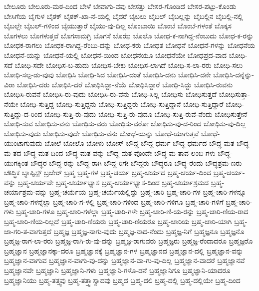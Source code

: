 ಬೇಲೂರು
ಬೇಲೂರು-ಮಠ-ದಿಂದ
ಬೇಳೆ
ಬೇವಾಗು-ವವು
ಬೇಸತ್ತು
ಬೇಸರ-ಗೊಂಡಿದೆ
ಬೇಸರ-ಪಟ್ಟು-ಕೊಂಡು
ಬೇಸಿಗೆಯ
ಬೈಗುಳ
ಬೈಠಕ್
ಬೈಠಕ್‌-ಖಾ-ನೆ-ಯಲ್ಲಿ
ಬೈದರೆ
ಬೈಬಲು
ಬೈಬಲ್
ಬೈಬಲ್ಲನ್ನು
ಬೈಬಲ್ಲಿನ
ಬೈಬಲ್ಲಿ-ನಲ್ಲಿ
ಬೈಬಲ್ಲೇ
ಬೈಬಲ್‌-ಗಳಿಂದ
ಬೈಯುತ್ತಾರೆ
ಬೈಯು-ವು-ದಿಲ್ಲ
ಬೊಂಬಾಯಿ
ಬೊಂಬೆ
ಬೊಂಬೆ-ಗಳಂತೆ
ಬೊಕ್ಕಸ
ಬೊಗಳಲು
ಬೊಗಳುತ್ತವೆ
ಬೊಗಸಾಮಗ್ರಿ
ಬೊಗಸೆ
ಬೊಝೆ
ಬೊಲೊ
ಬೋಧ-ಕ-ನಾಗಿದ್ದ-ನೆಂಬುದು
ಬೋಧ-ಕ-ರನ್ನು
ಬೋಧಕ-ರಾಗಲು
ಬೋಧಕ-ರಾಗಿದ್ದ-ರೆಂಬು-ದನ್ನು
ಬೋಧ-ಕರು
ಬೋಧತ
ಬೋಧನೆ
ಬೋಧನೆ-ಗಳನ್ನು
ಬೋಧನೆಯ
ಬೋಧನೆ-ಯನ್ನು
ಬೋಧನೆ-ಯಲ್ಲಿ
ಬೋಧನೆ-ಯಿಂದ
ಬೋಧನೆಯೂ
ಬೋಧನೆಯೇ
ಬೋಧಪ್ರದ-ವಾದ
ಬೋಧಿ-ಸದೆ
ಬೋಧಿ-ಸದೇ
ಬೋಧಿಸ-ಬ-ಹುದು
ಬೋಧಿಸ-ಬೇಕು
ಬೋಧಿಸ-ಲಾಗಿದೆ
ಬೋಧಿ-ಸ-ಲಾ-ರರು
ಬೋಧಿ-ಸಲು
ಬೋಧಿ-ಸಲ್ಪ-ಡು-ವುವು
ಬೋಧಿಸಿ
ಬೋಧಿ-ಸಿದ
ಬೋಧಿಸಿ-ದಂತೆ
ಬೋಧಿಸಿ-ದನು
ಬೋಧಿಸಿ-ದನೇ
ಬೋಧಿಸಿ-ದನ್ನೆನ್ನು-ವಿರಾ
ಬೋಧಿಸಿ-ದರು
ಬೋಧಿಸಿ-ದರೆ
ಬೋಧಿಸಿದ್ದಾ-ನೆಯೆ
ಬೋಧಿಸಿದ್ದಾರೆ
ಬೋಧಿ-ಸಿದ್ದು
ಬೋಧಿಸಿ-ರುವನು
ಬೋಧಿಸಿ-ರುವನೆ
ಬೋಧಿಸಿ-ರು-ವುದು
ಬೋಧಿಸಿ-ರು-ವೆನು
ಬೋಧಿ-ಸಿಲ್ಲ
ಬೋಧಿಸು
ಬೋಧಿಸುತ್ತದೆ
ಬೋಧಿಸುತ್ತಾ-ನೆಯೇ
ಬೋಧಿ-ಸುತ್ತಿದ್ದ
ಬೋಧಿ-ಸುತ್ತಿದ್ದನು
ಬೋಧಿ-ಸುತ್ತಿದ್ದರು
ಬೋಧಿ-ಸುತ್ತಿದ್ದಾನೆ
ಬೋಧಿ-ಸುತ್ತಿದ್ದಾರೆ
ಬೋಧಿ-ಸುತ್ತಿದ್ದು-ದ-ರಿಂದ
ಬೋಧಿ-ಸುತ್ತಿ-ರು-ವುದು
ಬೋಧಿ-ಸುತ್ತಿ-ರು-ವುದೂ
ಬೋಧಿ-ಸುತ್ತಿ-ರುವೆ-ನೆಂದು
ಬೋಧಿಸುತ್ತೇನೆ
ಬೋಧಿ-ಸುವ
ಬೋಧಿಸು-ವನು
ಬೋಧಿಸು-ವರು
ಬೋಧಿಸು-ವರೋ
ಬೋಧಿಸು-ವು-ದ-ರಿಂದ
ಬೋಧಿಸು-ವು-ದಿಲ್ಲ
ಬೋಧಿಸು-ವುದು
ಬೋಧಿಸು-ವುದೇ
ಬೋಧಿಸು-ವೆನು
ಬೋಧೆ-ಯನ್ನು
ಬೋಧೆ-ಯಾಗುತ್ತವೆ
ಬೋಧೆ-ಯುಂಟಾಗುವುದು
ಬೋಲೆ
ಬೋಲೊ
ಬೋಳು
ಬೋಸ್
ಬೌದ್ಧ
ಬೌದ್ಧ-ಧರ್ಮ
ಬೌದ್ಧ-ಧರ್ಮದ
ಬೌದ್ಧ-ಮತ
ಬೌದ್ಧ-ಮ-ತದ
ಬೌದ್ಧ-ಮತ-ದಿಂದ
ಬೌದ್ಧ-ಮತ-ವನ್ನು
ಬೌದ್ಧ-ಮತ-ವೊಂದೇ
ಬೌದ್ಧ-ಮ-ತಾವ-ಲಂಬಿ-ಗಳು
ಬೌದ್ಧ-ಯುಗಕ್ಕಿಂತ
ಬೌದ್ಧರ
ಬೌದ್ಧ-ರನ್ನು
ಬೌದ್ಧ-ರಾಗಿ
ಬೌದ್ಧ-ರಿಗೇ
ಬೌದ್ಧರು
ಬೌದ್ಧರೂ
ಬೌದ್ಧ-ರೆಂದು
ಬೌದ್ಧಶ್ರಮ-ಣರು
ಬೌದ್ಧಿಕ
ಬ್ಯಾಪ್ಟಿಸ್ಟ್
ಬ್ರಜೇರ್‌
ಬ್ರಹ್ಮ
ಬ್ರಹ್ಮ-ಗಳ
ಬ್ರಹ್ಮ-ಚರ್ಯ
ಬ್ರಹ್ಮ-ಚರ್ಯದ
ಬ್ರಹ್ಮ-ಚರ್ಯ-ದಿಂದ
ಬ್ರಹ್ಮ-ಚರ್ಯ-ವನ್ನು
ಬ್ರಹ್ಮ-ಚರ್ಯವೇ
ಬ್ರಹ್ಮ-ಚರ್ಯಾಭ್ಯಾಸ
ಬ್ರಹ್ಮ-ಚರ್ಯಾಭ್ಯಾಸ-ದಿಂದ
ಬ್ರಹ್ಮ-ಚರ್ಯಾಶ್ರಮದ
ಬ್ರಹ್ಮ-ಚರ್ಯಾಶ್ರಮ-ವನ್ನು
ಬ್ರಹ್ಮ-ಚರ್ಯೆಯ
ಬ್ರಹ್ಮ-ಚರ್ಯೆಯಲ್ಲಿದ್ದು
ಬ್ರಹ್ಮ-ಚಾರಿ
ಬ್ರಹ್ಮ-ಚಾರಿ-ಗಳ
ಬ್ರಹ್ಮ-ಚಾರಿ-ಗಳನ್ನೂ
ಬ್ರಹ್ಮ-ಚಾರಿ-ಗಳನ್ನೆಲ್ಲಾ
ಬ್ರಹ್ಮ-ಚಾರಿ-ಗ-ಳಲ್ಲಿ
ಬ್ರಹ್ಮ-ಚಾರಿ-ಗಳಿಂದ
ಬ್ರಹ್ಮ-ಚಾರಿ-ಗಳಿಗೂ
ಬ್ರಹ್ಮ-ಚಾರಿ-ಗಳಿಗೆ
ಬ್ರಹ್ಮ-ಚಾರಿ-ಗಳು
ಬ್ರಹ್ಮ-ಚಾರಿ-ಗಳೂ
ಬ್ರಹ್ಮ-ಚಾರಿ-ಗಳೆಲ್ಲಾ
ಬ್ರಹ್ಮ-ಚಾರಿ-ಗಳೇ
ಬ್ರಹ್ಮ-ಚಾರಿ-ಣಿ-ಯ-ರನ್ನು
ಬ್ರಹ್ಮ-ಚಾರಿ-ಣಿಯ-ರಾದ
ಬ್ರಹ್ಮ-ಚಾರಿ-ಣಿಯ-ರಿಲ್ಲದೆ
ಬ್ರಹ್ಮ-ಚಾರಿ-ಣಿಯರು
ಬ್ರಹ್ಮ-ಚಾರಿ-ಣಿಯರೂ
ಬ್ರಹ್ಮ-ಚಾರಿಯ
ಬ್ರಹ್ಮ-ಚಾರಿ-ಯಾಗಿ
ಬ್ರಹ್ಮ-ಜಾ-ಗರಿ-ತ-ವಾಗುತ್ತದೆ
ಬ್ರಹ್ಮಜ್ಞ
ಬ್ರಹ್ಮಜ್ಞ-ನಾಗು-ವುದು
ಬ್ರಹ್ಮಜ್ಞ-ನಾದ-ನೆಂದು
ಬ್ರಹ್ಮಜ್ಞ-ನಿಗೆ
ಬ್ರಹ್ಮಜ್ಞನೂ
ಬ್ರಹ್ಮಜ್ಞನೊ
ಬ್ರಹ್ಮಜ್ಞ-ರಾಗ-ಲಾ-ರರು
ಬ್ರಹ್ಮಜ್ಞ-ರಾಗಿ-ರು-ವು-ದನ್ನು
ಬ್ರಹ್ಮಜ್ಞ-ರಾಗುವರು
ಬ್ರಹ್ಮಜ್ಞರು
ಬ್ರಹ್ಮಜ್ಞ-ರೆಂದಾದರೂ
ಬ್ರಹ್ಮಜ್ಞರೊ
ಬ್ರಹ್ಮಜ್ಞಾನ
ಬ್ರಹ್ಮಜ್ಞಾನಕ್ಕಾ-ದರೂ
ಬ್ರಹ್ಮಜ್ಞಾನಕ್ಕೆ
ಬ್ರಹ್ಮಜ್ಞಾನ-ಗಳ
ಬ್ರಹ್ಮಜ್ಞಾನದ
ಬ್ರಹ್ಮಜ್ಞಾನ-ದಲ್ಲಿ
ಬ್ರಹ್ಮಜ್ಞಾನ-ವನ್ನು
ಬ್ರಹ್ಮಜ್ಞಾನ-ವಾಗುವ
ಬ್ರಹ್ಮಜ್ಞಾನ-ವಾಗು-ವು-ದನ್ನು
ಬ್ರಹ್ಮಜ್ಞಾನ-ವಾ-ಗು-ವು-ದಿಲ್ಲ
ಬ್ರಹ್ಮಜ್ಞಾನ-ವಾದರೆ
ಬ್ರಹ್ಮಜ್ಞಾನವೆ
ಬ್ರಹ್ಮಜ್ಞಾನವೇ
ಬ್ರಹ್ಮಜ್ಞಾನಿ
ಬ್ರಹ್ಮಜ್ಞಾನಿ-ಗಳು
ಬ್ರಹ್ಮಜ್ಞಾನಿ-ಗಳೊ-ಡನೆ
ಬ್ರಹ್ಮಜ್ಞಾನಿಗೂ
ಬ್ರಹ್ಮಜ್ಞಾನಿ-ಯಾದರೂ
ಬ್ರಹ್ಮಜ್ಞಾನಿಯು
ಬ್ರಹ್ಮ-ತತ್ತ್ವವು
ಬ್ರಹ್ಮ-ತತ್ತ್ವಾಸ್ವಾದವು
ಬ್ರಹ್ಮದ
ಬ್ರಹ್ಮ-ದಲಿ
ಬ್ರಹ್ಮ-ದಲ್ಲಿ
ಬ್ರಹ್ಮ-ದಲ್ಲಿಯೇ
ಬ್ರಹ್ಮ-ದಿಂದ
